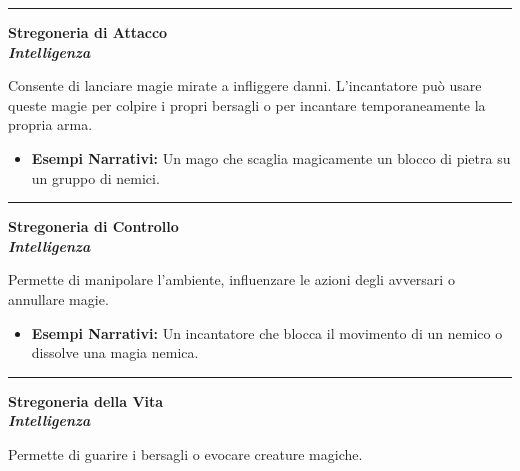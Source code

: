 \documentclass[../manuale_main.tex]{subfiles}
\begin{document}
\vspace{0.5cm}
\noindent
\begin{center}
\rule{\textwidth}{0.4pt} 
\end{center}
\vspace{0.5cm}

\begin{center}
\textbf{\large{Stregoneria di Attacco}}\\ \textit{\textbf{Intelligenza}}\\
\end{center}
Consente di lanciare magie mirate a infliggere danni. L'incantatore può usare queste magie per colpire i propri bersagli o per incantare temporaneamente la propria arma.

\begin{itemize}
\item \textbf{Esempi Narrativi:} Un mago che scaglia magicamente un blocco di pietra su un gruppo di nemici.
\end{itemize}

\vspace{0.5cm}
\noindent
\begin{center}
\rule{\textwidth}{0.4pt} 
\end{center}
\vspace{0.5cm}

\begin{center}
\textbf{\large{Stregoneria di Controllo}}\\ \textit{\textbf{Intelligenza}}\\
\end{center}
Permette di manipolare l’ambiente, influenzare le azioni degli avversari o annullare magie.

\begin{itemize}
\item \textbf{Esempi Narrativi:} Un incantatore che blocca il movimento di un nemico o dissolve una magia nemica.
\end{itemize}

\vspace{0.5cm}
\noindent
\begin{center}
\rule{\textwidth}{0.4pt} 
\end{center}
\vspace{0.5cm}

\begin{center}
\textbf{\large{Stregoneria della Vita}}\\ \textit{\textbf{Intelligenza}}\\
\end{center}
Permette di guarire i bersagli o evocare creature magiche.
\end{document}
